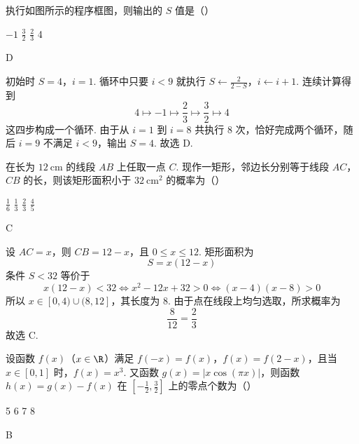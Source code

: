 \begin{problem}
执行如图所示的程序框图，则输出的 \(S\) 值是（\quad）


\choices
    {\(-1\)}
    {\( \frac{3}{2} \)}
    {\( \frac{2}{3} \)}
    {4}
\end{problem}

\begin{answer}
D
\end{answer}

\begin{solution}
初始时 \(S=4\)，\(i=1\). 循环中只要 \(i<9\) 就执行
\(S\leftarrow\frac{2}{2-S}\)，\(i\leftarrow i+1\).
连续计算得到
\[
4\longmapsto-1\longmapsto\frac23\longmapsto\frac32\longmapsto4
\]
这四步构成一个循环. 由于从 \(i=1\) 到 \(i=8\) 共执行 \(8\) 次，恰好完成两个循环，随后 \(i=9\) 不满足 \(i<9\)，输出 \(S=4\). 故选 D.
\end{solution}

\begin{problem}
在长为 \(12 \mathrm{~cm}\) 的线段 \(AB\) 上任取一点 \(C\). 现作一矩形，邻边长分别等于线段 \(AC\)，\(CB\) 的长，则该矩形面积小于 \(32 \mathrm{~cm}^{2}\) 的概率为（\quad）

\choices
    {\(\frac{1}{6}\)}
    {\( \frac{1}{3} \)}
    {\( \frac{2}{3} \)}
    {\( \frac{4}{5} \)}
\end{problem}

\begin{answer}
C
\end{answer}

\begin{solution}
设 \(AC=x\)，则 \(CB=12-x\)，且 \(0\leqslant x\leqslant12\). 矩形面积为
\[
S=x(12-x)
\]
条件 \(S<32\) 等价于
\[
x(12-x)<32\iff x^2-12x+32>0\iff (x-4)(x-8)>0
\]
所以 \(x\in[0,4)\cup(8,12]\)，其长度为 \(8\). 由于点在线段上均匀选取，所求概率为
\[
\frac{8}{12}=\frac23
\]
故选 C.
\end{solution}

\begin{problem}
设函数 \(f(x)\)（\(x \in \R\)）满足 \(f(-x) = f(x)\)，\(f(x) = f(2 - x)\)，且当 \(x \in [0,1]\) 时，\(f(x) = x^3\). 又函数 \(g(x) = |x\cos(\pi x)|\)，则函数 \(h(x) = g(x) - f(x)\) 在 \(\left[-\frac{1}{2}, \frac{3}{2}\right]\) 上的零点个数为（\quad）

\choices
    {5}
    {6}
    {7}
    {8}
\end{problem}

\begin{answer}
B
\end{answer}

